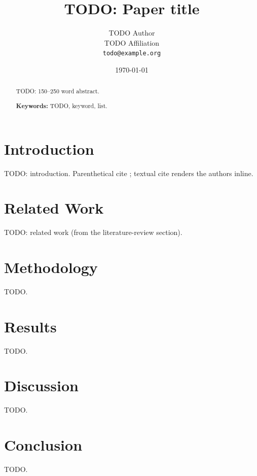 \documentclass[11pt,a4paper]{article}
\title{TODO: Paper title}
\author{TODO Author\\ \small TODO Affiliation \\ \small\texttt{todo@example.org}}
\date{\today}
\begin{document}
\maketitle

\begin{abstract}
TODO: 150--250 word abstract. %

\smallskip\noindent\textbf{Keywords:} TODO, keyword, list.
\end{abstract}

\section{Introduction}
TODO: introduction. Parenthetical cite \citep{example2024}; textual cite
\citet{example2024} renders the authors inline.

\section{Related Work}
TODO: related work (from the literature-review section).

\section{Methodology}
TODO.

\section{Results}
TODO.

\section{Discussion}
TODO.

\section{Conclusion}
TODO.



\end{document}
